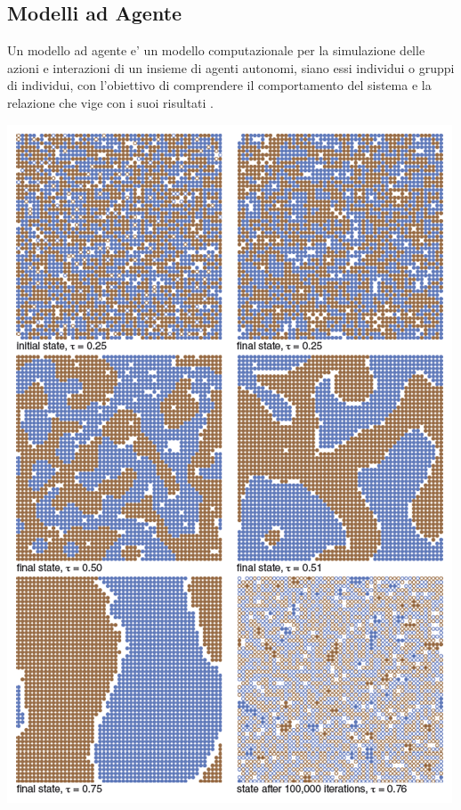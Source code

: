 \subsection{Modelli ad Agente}
Un modello ad agente e' un modello computazionale per la simulazione delle 
azioni e interazioni di un insieme di agenti autonomi, siano essi individui
o gruppi di individui, con l'obiettivo di comprendere il comportamento 
del sistema e la relazione che vige con i suoi risultati \cite{wiki:Agent-based_model}
\cite{7822080}.

\begin{minipage}{\linewidth}
    \centering
    \includegraphics[scale=0.5]{img/201381146479794-2013-09HayesF1png.png}
    \label{fig:schelling_segregation_abm}
\end{minipage}

